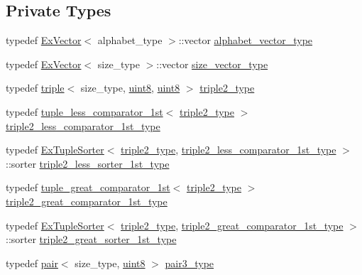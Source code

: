 \subsection*{Private Types}
\begin{DoxyCompactItemize}
\item 
typedef \hyperlink{struct_ex_vector}{Ex\+Vector}$<$ alphabet\+\_\+type $>$\+::vector \hyperlink{class_test_aace52a5af52c5d5f457ec201881ab2ab}{alphabet\+\_\+vector\+\_\+type}
\item 
typedef \hyperlink{struct_ex_vector}{Ex\+Vector}$<$ size\+\_\+type $>$\+::vector \hyperlink{class_test_a9290f9f05f2aac6555e7366cf214d186}{size\+\_\+vector\+\_\+type}
\item 
typedef \hyperlink{structtriple}{triple}$<$ size\+\_\+type, \hyperlink{types_8h_a115946cb5fc5879545e9ccea096a6031}{uint8}, \hyperlink{types_8h_a115946cb5fc5879545e9ccea096a6031}{uint8} $>$ \hyperlink{class_test_ae1d42342f4ec472a724f55af01c3c5ab}{triple2\+\_\+type}
\item 
typedef \hyperlink{structtuple__less__comparator__1st}{tuple\+\_\+less\+\_\+comparator\+\_\+1st}$<$ \hyperlink{class_test_ae1d42342f4ec472a724f55af01c3c5ab}{triple2\+\_\+type} $>$ \hyperlink{class_test_a8eb2bb639be9c46697c52f77d79703a8}{triple2\+\_\+less\+\_\+comparator\+\_\+1st\+\_\+type}
\item 
typedef \hyperlink{struct_ex_tuple_sorter}{Ex\+Tuple\+Sorter}$<$ \hyperlink{class_test_ae1d42342f4ec472a724f55af01c3c5ab}{triple2\+\_\+type}, \hyperlink{class_test_a8eb2bb639be9c46697c52f77d79703a8}{triple2\+\_\+less\+\_\+comparator\+\_\+1st\+\_\+type} $>$\+::sorter \hyperlink{class_test_a1e7fba953871f5eee60eabf8b0e287b7}{triple2\+\_\+less\+\_\+sorter\+\_\+1st\+\_\+type}
\item 
typedef \hyperlink{structtuple__great__comparator__1st}{tuple\+\_\+great\+\_\+comparator\+\_\+1st}$<$ \hyperlink{class_test_ae1d42342f4ec472a724f55af01c3c5ab}{triple2\+\_\+type} $>$ \hyperlink{class_test_aeafbf94ce50f60c6c463e2e57a4d43a5}{triple2\+\_\+great\+\_\+comparator\+\_\+1st\+\_\+type}
\item 
typedef \hyperlink{struct_ex_tuple_sorter}{Ex\+Tuple\+Sorter}$<$ \hyperlink{class_test_ae1d42342f4ec472a724f55af01c3c5ab}{triple2\+\_\+type}, \hyperlink{class_test_aeafbf94ce50f60c6c463e2e57a4d43a5}{triple2\+\_\+great\+\_\+comparator\+\_\+1st\+\_\+type} $>$\+::sorter \hyperlink{class_test_ad87ac75730f80ef0824f0c56ec7db12d}{triple2\+\_\+great\+\_\+sorter\+\_\+1st\+\_\+type}
\item 
typedef \hyperlink{structpair}{pair}$<$ size\+\_\+type, \hyperlink{types_8h_a115946cb5fc5879545e9ccea096a6031}{uint8} $>$ \hyperlink{class_test_a9c312a6616c86eaf224d04d298f58ed4}{pair3\+\_\+type}

\end{DoxyCompactItemize}
